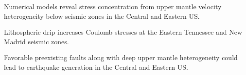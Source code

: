 \documentclass[draft,linenumbers]{agujournal2018}
\begin{document}



\begin{keypoints}
\item Numerical models reveal stress concentration from upper mantle velocity heterogeneity below seismic zones in the Central and Eastern US.
\item Lithospheric drip increases Coulomb stresses at the Eastern Tennessee and New Madrid seismic zones. 
\item Favorable preexisting faults along with deep upper mantle  heterogeneity could lead to earthquake generation in the Central and Eastern US.
\end{keypoints}

%
%

\end{document}
